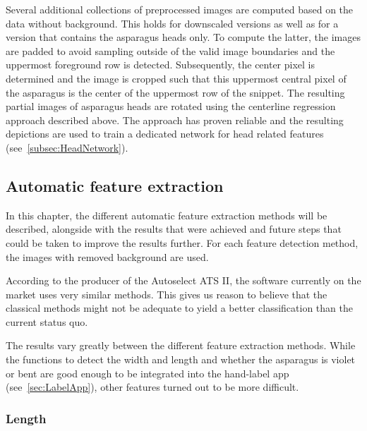 \bigskip
Several additional collections of preprocessed images are computed based on the data without background. This holds for downscaled versions as well as for a version that contains the asparagus heads only. To compute the latter, the images are padded to avoid sampling outside of the valid image boundaries and the uppermost foreground row is detected. Subsequently, the center pixel is determined and the image is cropped such that this uppermost central pixel of the asparagus is the center of the uppermost row of the snippet. The resulting partial images of asparagus heads are rotated using the centerline regression approach described above. The approach has proven reliable and the resulting depictions are used to train a dedicated network for head related features (see~\autoref{subsec:HeadNetwork}).


\subsection{Automatic feature extraction}
\label{sec:AutomaticFeatureExtraction}

In this chapter, the different automatic feature extraction methods will be described, alongside with the results that were achieved and future steps that could be taken to improve the results further. For each feature detection method, the images with removed background are used. 

\bigskip
According to the producer of the Autoselect ATS II, the software currently on the market uses very similar methods. This gives us reason to believe that the classical methods might not be adequate to yield a better classification than the current status quo.

The results vary greatly between the different feature extraction methods. While the functions to detect the width and length and whether the asparagus is violet or bent are good enough to be integrated into the hand-label app (see~\autoref{sec:LabelApp}), other features turned out to be more difficult.


\subsubsection{Length}
\label{subsec:Length}

